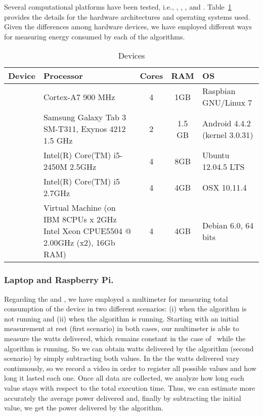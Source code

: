 Several computational platforms have been tested, i.e., \raspberrynsp, \tabletnsp, \laptopnsp, \iMac and \bladensp.  Table~\ref{Table:devices} provides the details for the hardware architectures and operating systems used. Given the differences among hardware devices, we have employed different ways  %
for measuring energy consumed by each of the algorithms.  

\begin{table}[!t]
\centering
\caption{Devices}
\label{Table:devices}
\begin{tabular}{lp{4.5cm}ccp{3cm}} \hline
Device		&	Processor			&	Cores	&	RAM &	OS		\\ 
\hline
\raspberry   	& Cortex-A7 900 MHz			&	 4 	&	1GB &	Raspbian GNU/Linux 7	\\
\tablet		& Samsung Galaxy Tab 3 SM-T311, Exynos 4212 1.5 GHz& 2  & 1.5 GB &	Android	4.4.2 (kernel 3.0.31) \\
\laptop 		& Intel(R) Core(TM) i5-2450M 2.5GHz	&	4	&	8GB &	Ubuntu 12.04.5 LTS \\
\iMac		& Intel(R) Core(TM) i5 2.7GHz	& 4	& 4GB 	&OSX 10.11.4			\\
\blade		& Virtual Machine (on IBM 8CPUs x 2GHz Intel Xeon CPUE5504 @ 2.00GHz (x2), 16Gb RAM) & 4 & 4GB & Debian 6.0, 64 bits\\
\hline
\end{tabular}
\end{table}


\subsubsection*{Laptop and Raspberry Pi.}
Regarding the \laptop and \raspberrynsp, we have employed a multimeter for measuring total consumption of the device in two different scenarios:  (i) when the algorithm is 
not running and (ii) when the algorithm is running.  Starting with an initial measurement at rest (first scenario) in both cases, our multimeter is able to measure the watts 
delivered, which remains constant in the case of \raspberrynsp~while the algorithm is running. So we can obtain watts delivered by the algorithm (second scenario) by 
simply subtracting both values. 
In the \laptop the watts delivered vary continuously, so we record a video in order to register all possible values and how long it lasted each one. Once all data are 
collected, we analyze how long each value stays with respect to the total execution time. Thus, we can estimate more accurately the average power delivered and, finally 
by subtracting the initial value, we get the power delivered by the algorithm. %

